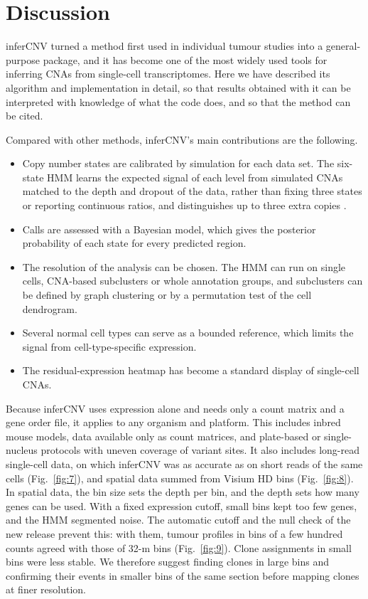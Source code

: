 \section{Discussion}\label{sec:discussion}

inferCNV turned a method first used in individual tumour studies into a general-purpose package, and it has become one of the most widely used tools for inferring CNAs from single-cell transcriptomes. Here we have described its algorithm and implementation in detail, so that results obtained with it can be interpreted with knowledge of what the code does, and so that the method can be cited.

Compared with other methods, inferCNV's main contributions are the following.
\begin{itemize}
\tightlist
\item Copy number states are calibrated by simulation for each data set. The six-state HMM learns the expected signal of each level from simulated CNAs matched to the depth and dropout of the data, rather than fixing three states or reporting continuous ratios, and distinguishes up to three extra copies \citep{schmid2025}.
\item Calls are assessed with a Bayesian model, which gives the posterior probability of each state for every predicted region.
\item The resolution of the analysis can be chosen. The HMM can run on single cells, CNA-based subclusters or whole annotation groups, and subclusters can be defined by graph clustering or by a permutation test of the cell dendrogram.
\item Several normal cell types can serve as a bounded reference, which limits the signal from cell-type-specific expression.
\item The residual-expression heatmap has become a standard display of single-cell CNAs.
\end{itemize}
Because inferCNV uses expression alone and needs only a count matrix and a gene order file, it applies to any organism and platform. This includes inbred mouse models, data available only as count matrices, and plate-based or single-nucleus protocols with uneven coverage of variant sites. It also includes long-read single-cell data, on which inferCNV was as accurate as on short reads of the same cells (Fig.~\ref{fig:7}), and spatial data summed from Visium HD bins (Fig.~\ref{fig:8}). In spatial data, the bin size sets the depth per bin, and the depth sets how many genes can be used. With a fixed expression cutoff, small bins kept too few genes, and the HMM segmented noise. The automatic cutoff and the null check of the new release prevent this: with them, tumour profiles in bins of a few hundred counts agreed with those of 32-\textmu m bins (Fig.~\ref{fig:9}). Clone assignments in small bins were less stable. We therefore suggest finding clones in large bins and confirming their events in smaller bins of the same section before mapping clones at finer resolution.

